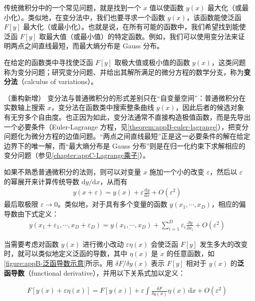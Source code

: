 \documentclass[../main.tex]{subfiles}
\begin{document}
传统微积分中的一个常见问题，就是找到一个 $x$ 值以使函数 $y(x)$ 最大化（或最小化）。类似地，在变分法中，我们也要寻求一个函数 $y(x)$，该函数能使泛函 $F[y]$ 最大化（或最小化）。也就是说，在所有可能的函数中，我们希望找到能使泛函 $F[y]$ 取最大值（或最小值）的特定函数。例如，我们可以使用变分法来证明两点之间直线最短，而最大熵分布是 Gauss 分布。

\begin{definition}[变分法]\label{definition:appB-变分法}
在给定的函数类中寻找使泛函 $F[y]$ 取极大值或极小值的函数 $y(x)$，这类问题称为变分问题；研究变分问题、并给出其解所满足的微分方程的数学分支，称为\textbf{变分法}（calculus of variations）。
\end{definition}

\begin{remark}（重构新增）
变分法与普通微积分的形式差别只在“自变量空间”：普通微积分在实数轴上搜索 $x$，变分法在函数类中搜索整条曲线 $y(x)$，因此后者的候选对象有无穷多个自由度。也正因为如此，变分法通常不直接构造极值函数，而是先导出一个必要条件（Euler-Lagrange 方程，见\cref{theorem:appB-euler-lagrange}），把变分问题化为微分方程的边值问题。“两点之间直线最短”正是这一必要条件的解在给定边界下的唯一解，而“最大熵分布是 Gauss 分布”则是在归一化约束下求解相应的变分问题（参见\cref{chapter:appC-Lagrange乘子}）。
\end{remark}

如果不熟悉普通微积分的法则，则可以对变量 $x$ 施加一个小的改变 $\varepsilon$，然后以 $\varepsilon$ 的幂展开来计算传统导数 $\mathrm{d}y/\mathrm{d}x$，从而有
\begin{align}
  y(x+\varepsilon)=y(x)+\varepsilon\frac{\mathrm{d}y}{\mathrm{d}x}+O(\varepsilon^{2})
  \label{align:appB-导数展开}
\end{align}
最后取极限 $\varepsilon\to0$。类似地，对于具有多个变量的函数 $y(x_1,\cdots,x_D)$，相应的偏导数由下式定义：
\begin{align}
  y(x_1+\varepsilon_1,\cdots,x_D+\varepsilon_D)=y(x_1,\cdots,x_D)+\sum_{i=1}^{D}\varepsilon_i\frac{\partial y}{\partial x_i}+O(\varepsilon^{2})
  \label{align:appB-偏导展开}
\end{align}

当需要考虑对函数 $y(x)$ 进行微小改动 $\varepsilon\eta(x)$ 会使泛函 $F[y]$ 发生多大的改变时，就可以类似地定义泛函的导数，其中 $\eta(x)$ 是 $x$ 的任意函数，如\cref{figure:appB-泛函导数示意}所示。用 $\delta F/\delta y(x)$ 表示 $F[y]$ 相对于 $y(x)$ 的\textbf{泛函导数}（functional derivative），并用以下关系式加以定义：
\begin{definition}[泛函导数]\label{definition:appB-泛函导数}
\begin{align}
  F[y(x)+\varepsilon\eta(x)]=F[y(x)]+\varepsilon\int\frac{\delta F}{\delta y(x)}\eta(x)\,\mathrm{d}x+O(\varepsilon^{2})
  \label{align:appB-泛函导数定义}
\end{align}
\end{definition}
\end{document}
